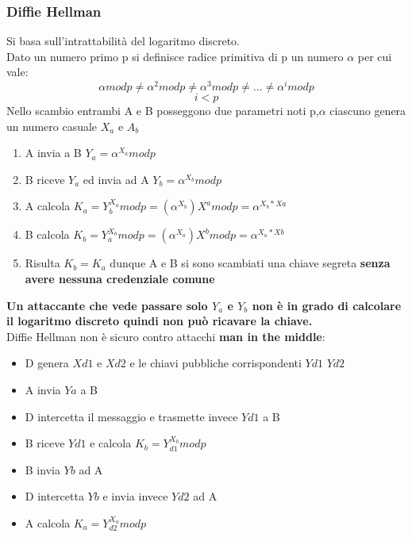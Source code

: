 \documentclass[12pt]{article}
\begin{document}
			\subsubsection{Diffie Hellman}
				Si basa sull'intrattabilità del logaritmo discreto.\\
				Dato un numero primo p si definisce radice primitiva di p un numero $\alpha$ per cui vale:
				$$\alpha modp \neq \alpha^{2} modp \neq \alpha^{3} modp \neq ... \neq \alpha^{i} modp  $$
				$$i<p $$
				Nello scambio entrambi A e B posseggono due parametri noti p,$\alpha$ ciascuno genera un numero casuale $X_{a}$ e $A_{b}$
				\begin{enumerate}
					\item A invia a B $Y_{a}= \alpha^{X_{a}} modp$
					\item B riceve $Y_{a}$ ed invia ad A $Y_{b}=\alpha^{X_{b}}modp$
					\item A calcola $K_{a} = Y_{b}^{X_{a}}modp = (\alpha^{X_{b}})X^{a}modp= \alpha^{X_{b}*X{a}}$
					\item B calcola $K_{b} = Y_{a}^{X_{b}}modp = (\alpha^{X_{a}})X^{b}modp= \alpha^{X_{a}*X{b}}$
					\item Risulta $K_{b} = K_{a}$ dunque A e B si sono scambiati una chiave segreta \textbf{senza avere nessuna credenziale comune}
 				\end{enumerate}	
 				\textbf{Un attaccante che vede passare solo $Y_{a}$ e $Y_{b}$ non è in grado di calcolare il logaritmo discreto quindi non può ricavare la chiave.}\\
 				Diffie Hellman non è sicuro contro attacchi \textbf{man in the middle}:
 				\begin{itemize}
 					\item D genera $X{d1}$ e $X{d2}$ e le chiavi pubbliche corrispondenti $Y{d1}$ $Y{d2}$
 					\item A invia $Y{a}$ a B
 					\item D intercetta il messaggio e trasmette invece $Y{d1}$ a B
 					\item B riceve $Y{d1}$ e calcola $K_{b}= Y_{d1}^{X_{b}}modp$
 					\item B invia $Y{b}$ ad A
 					\item D intercetta $Y{b}$ e invia invece $Y{d2}$ ad A
 					\item A calcola $K_{a}= Y_{d2}^{X_{a}}modp$
 				\end{itemize}
 				
\end{document}

